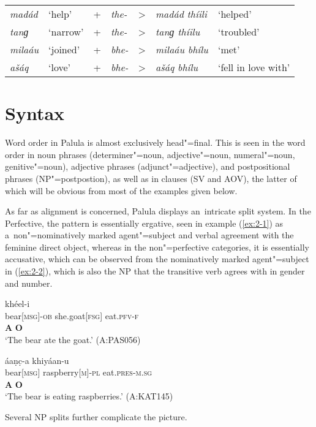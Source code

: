 \begin{table}[H]
\begin{tabularx}{\textwidth}{ l l l l l l l}
\textit{madád} &
`help' &
+ &
\textit{the-} &
{\textgreater} &
\textit{madád thíili} &
`helped'\\
\textit{tanɡ} &
`narrow' &
+ &
\textit{the-} &
{\textgreater} &
\textit{tanɡ thíilu} &
`troubled'\\
\textit{milaáu} &
`joined' &
+ &
\textit{bhe-} &
{\textgreater} &
\textit{milaáu bhílu} &
`met'\\
\textit{ašáq} &
`love' &
+ &
\textit{bhe-} &
{\textgreater} &
\textit{ašáq bhílu} &
`fell in love with'\\
\end{tabularx}
\end{table}



\section{Syntax}
\label{sec:2-3}
Word order in Palula is almost exclusively head"=final. This is seen in the word order in noun phrases (determiner"=noun, adjective"=noun, numeral"=noun, genitive"=noun), adjective phrases (adjunct"=adjective), and postpositional phrases (NP"=postpostion), as well as in clauses (SV and AOV), the latter of which will be obvious from most of the examples given below.


As far as alignment is concerned, Palula displays an~intricate split system. In the Perfective, the pattern is essentially ergative, seen in example (\ref{ex:2-1}) as a~non"=nominatively marked agent"=subject and verbal agreement with the feminine direct object, whereas in the non"=perfective categories, it is essentially accusative, which can be observed from the nominatively marked agent"=subject in (\ref{ex:2-2}), which is also the NP that the transitive verb agrees with in gender and number.

\begin{exe}
\ex
\label{ex:2-1}
\glll [íṇc̣-a] [čhéeli] khéel-i \\
bear[\textsc{msg}]-\textsc{ob} she.goat[\textsc{fsg}] eat.\textsc{pfv-}\textsc{f}\\
\textbf{A} \textbf{O} \\
\glt `The bear ate the goat.' (A:PAS056)
\end{exe}

\begin{exe}
\ex
\label{ex:2-2}
\glll [iṇc̣] áaṇc̣-a khiyáan-u\\
bear[\textsc{msg}] raspberry[\textsc{m}]-\textsc{pl} eat.\textsc{pres-m.sg} \\
\textbf{A} \textbf{O} \\
\glt `The bear is eating raspberries.' (A:KAT145)
\end{exe} 
Several NP splits further complicate the picture.


